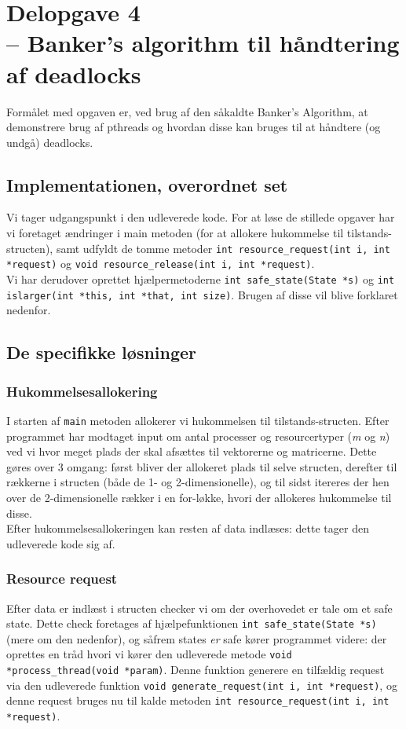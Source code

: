 \documentclass[main.tex]{subfile}
\begin{document}
\section{Delopgave 4\\\normalsize{-- Banker's algorithm til håndtering af deadlocks}}
Formålet med opgaven er, ved brug af den såkaldte Banker's Algorithm, at demonstrere brug af pthreads og hvordan disse kan bruges til at håndtere (og undgå) deadlocks.

\subsection{Implementationen, overordnet set}
Vi tager udgangspunkt i den udleverede kode. For at løse de stillede opgaver har vi foretaget ændringer i main metoden (for at allokere hukommelse til tilstands-structen), samt udfyldt de tomme metoder \texttt{int resource\_request(int i, int *request)} og \texttt{void resource\_release(int i, int *request)}.\\

Vi har derudover oprettet hjælpermetoderne \texttt{int safe\_state(State *s)} og \texttt{int islarger(int *this, int *that, int size)}. Brugen af disse vil blive forklaret nedenfor.

\subsection{De specifikke løsninger}

\subsubsection{Hukommelsesallokering}
I starten af \texttt{main} metoden allokerer vi hukommelsen til tilstands-structen. Efter programmet har modtaget input om antal processer og resourcertyper (\textit{m} og \textit{n}) ved vi hvor meget plads der skal afsættes til vektorerne og matricerne. Dette gøres over 3 omgang: først bliver der allokeret plads til selve structen, derefter til rækkerne i structen (både de 1- og 2-dimensionelle), og til sidst itereres der hen over de 2-dimensionelle rækker i en for-løkke, hvori der allokeres hukommelse til disse.\\

Efter hukommelsesallokeringen kan resten af data indlæses: dette tager den udleverede kode sig af.

\subsubsection{Resource request}
Efter data er indlæst i structen checker vi om der overhovedet er tale om et safe state. Dette check foretages af hjælpefunktionen \texttt{int safe\_state(State *s)} (mere om den nedenfor), og såfrem states \textit{er} safe kører programmet videre: der oprettes en tråd hvori vi kører den udleverede metode \texttt{void *process\_thread(void *param)}. Denne funktion generere en tilfældig request via den udleverede funktion \texttt{void generate\_request(int i, int *request)}, og denne request bruges nu til kalde metoden \texttt{int resource\_request(int i, int *request)}.\\
\end{document}
